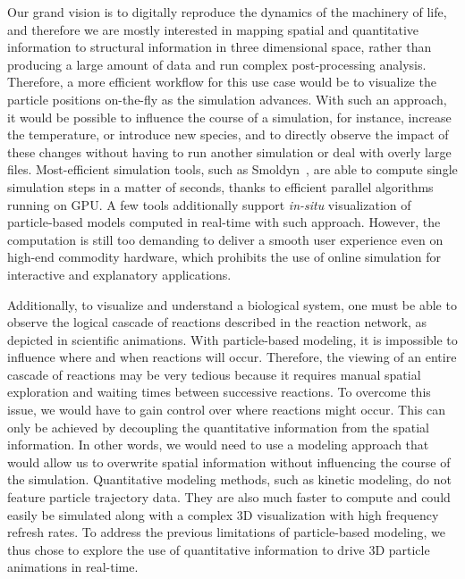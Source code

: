 Our grand vision is to digitally reproduce the dynamics of the machinery of life, and therefore we are mostly interested in mapping spatial and quantitative information to structural information in three dimensional space, rather than producing a large amount of data and run complex post-processing analysis.
Therefore, a more efficient workflow for this use case would be to visualize the particle positions on-the-fly as the simulation advances.
With such an approach, it would be possible to influence the course of a simulation, for instance, increase the temperature, or introduce new species, and to directly observe the impact of these changes without having to run another simulation or deal with overly large files.
Most-efficient simulation tools, such as Smoldyn~\cite{andrews2010detailed}, are able to compute single simulation steps in a matter of seconds, thanks to efficient parallel algorithms running on GPU.
A few tools additionally support \textit{in-situ} visualization of particle-based models computed in real-time with such approach.
However, the computation is still too demanding to deliver a smooth user experience even on high-end commodity hardware, which prohibits the use of online simulation for interactive and explanatory applications.

Additionally, to visualize and understand a biological system, one must be able to observe the logical cascade of reactions described in the reaction network, as depicted in scientific animations.
With particle-based modeling, it is impossible to influence where and when reactions will occur.
Therefore, the viewing of an entire cascade of reactions may be very tedious because it requires manual spatial exploration and waiting times between successive reactions.
To overcome this issue, we would have to gain control over where reactions might occur.
This can only be achieved by decoupling the quantitative information from the spatial information.
In other words, we would need to use a modeling approach that would allow us to overwrite spatial information without influencing the course of the simulation.
Quantitative modeling methods, such as kinetic modeling, do not feature particle trajectory data.
They are also much faster to compute and could easily be simulated along with a complex 3D visualization with high frequency refresh rates.
To address the previous limitations of particle-based modeling, we thus chose to explore the use of quantitative information to drive 3D particle animations in real-time.



